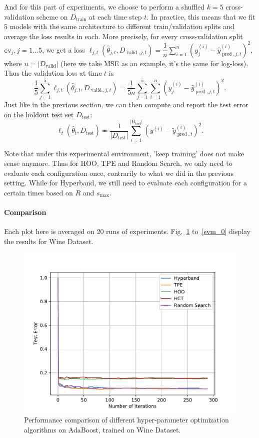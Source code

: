 \documentclass[runningheads,a4paper]{llncs}
\begin{document}
And for this part of experiments, we choose to perform a shuffled $k=5$ cross-validation scheme on $D_{\operatorname{train}}$ at each time step $t$. In practice, this means that we fit $5$ models with the same architecture to different train/validation splits and average the loss results in each. More precisely, for every cross-validation split 
$\mathtt{cv}_j,j=1\ldots5$, we get a loss $\ell_{j,t}(\hat{\theta}_{j,t}, D_{\operatorname{valid},j,t}) = \dfrac{1}{n} \sum^{n}_{i=1} \left(y^{(i)}_{j} - \hat{y}^{(i)}_{\operatorname{pred},j,t}\right)^2$, where $n=|D_{\operatorname{valid}}|$ (here we take MSE as an example, it's the same for log-loss). Thus the validation loss at time $t$ is
\[
\frac{1}{5}\sum_{j=1}^{5}\ell_{j,t}(\hat{\theta}_{j,t}, D_{\operatorname{valid},j,t}) = \frac{1}{5n}\sum_{j=1}^{5} \sum_{i=1}^n \left(y^{(i)}_{j} - \hat{y}^{(i)}_{\operatorname{pred},j,t}\right)^2.
\]
Just like in the previous section, we can then compute and report the test error on the holdout test set $D_{\operatorname{test}}$:
\[
\ell_{t}(\hat{\theta}_t, D_{\operatorname{test}}) = \frac{1}{|D_{\operatorname{test}}|} \sum_{i=1}^{|D_{\operatorname{test}}|} \left(y^{(i)} - \tilde{y}^{(i)}_{\operatorname{pred},t}\right)^2.
\]

Note that under this experimental environment, 'keep training' does not make sense anymore. Thus for HOO, TPE and Random Search, we only need to evaluate each configuration once, contrarily to what we did in the previous setting. While for Hyperband, we still need to evaluate each configuration for a certain times based on $R$ and $s_{\max}$.

\paragraph{\textbf{Comparison}} Each plot here is averaged on 20 runs of experiments. Fig.~\ref{ada_0} to~\ref{svm_0} display the results for Wine Dataset.

\begin{figure}[ht]
    \centering
    \includegraphics[scale=0.8]{img/uci/ada_0.pdf}
    \caption{Performance comparison of different hyper-parameter optimization algorithms on AdaBoost, trained on Wine Dataset.}
    \label{ada_0}
\end{figure}
\end{document}

